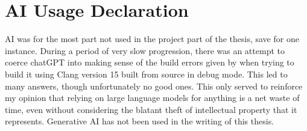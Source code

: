 \section*{AI Usage Declaration}
AI was for the most part not used in the project part of the thesis, save for one instance. During a period of very slow progression, there was an attempt to coerce chatGPT into making sense of the build errors given by \taffo{} when trying to build it using Clang version 15 built from source in debug mode. This led to many answers, though unfortunately no good ones. This only served to reinforce my opinion that relying on large language models for anything is a net waste of time, even without considering the blatant theft of intellectual property that it represents. Generative AI has not been used in the writing of this thesis.
